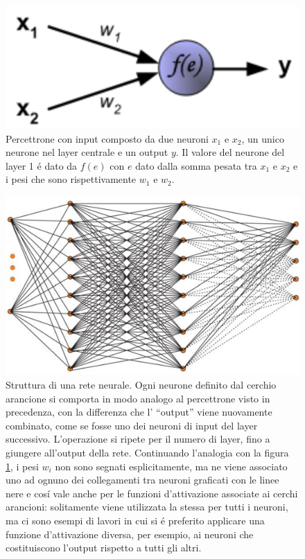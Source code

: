 \documentclass[a4paper,10pt]{article}
\begin{document}
 \begin{figure}[h!]
  \centering
  \includegraphics[scale=0.2]{perceptron.png}
  \caption{Percettrone con input composto da due neuroni $x_1$ e $x_2$, un unico neurone nel layer centrale e un output $y$. Il valore del neurone del layer 1 \'e dato da $f(e)$ con $e$ dato dalla somma pesata tra $x_1$ e $x_2$ e i pesi che sono rispettivamente $w_1$ e $w_2$.}
  \label{perceptronpng}
 \end{figure}
 
 \begin{figure}[h!]
  \centering
  \includegraphics[scale=0.3]{NeuralNetwork.png}
  \caption{Struttura di una rete neurale. Ogni neurone definito dal cerchio arancione si comporta in modo analogo al percettrone visto in precedenza, con la differenza che l' ``output'' viene nuovamente combinato, come se fosse uno dei neuroni di input del layer successivo. L'operazione si ripete per il numero di layer, fino a giungere all'output della rete. Continuando l'analogia con la figura \ref{perceptronpng}, i pesi $w_i$ non sono segnati esplicitamente, ma ne viene associato uno ad ognuno dei collegamenti tra neuroni graficati con le linee nere e cos\'i vale anche per le funzioni d'attivazione associate ai cerchi arancioni: solitamente viene utilizzata la stessa per tutti i neuroni, ma ci sono esempi di lavori in cui si \'e preferito applicare una funzione d'attivazione diversa, per esempio, ai neuroni che costituiscono l'output rispetto a tutti gli altri.}
  \label{NeuralNetworkpng}
 \end{figure}
\end{document}
